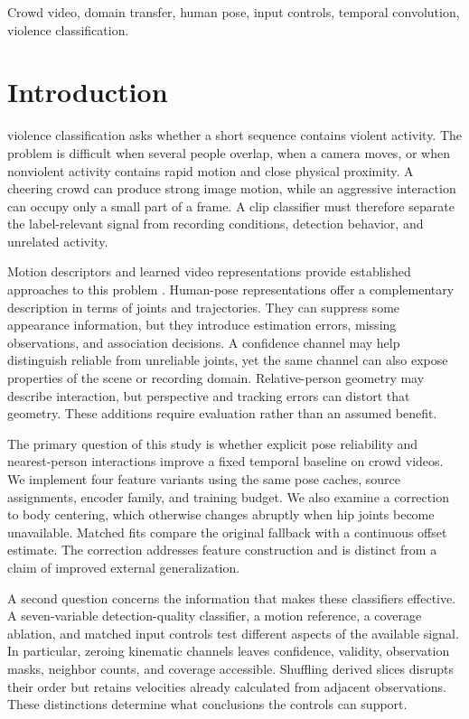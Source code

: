\documentclass[journal]{IEEEtai}
\begin{document}
\begin{IEEEkeywords}
Crowd video, domain transfer, human pose, input controls, temporal convolution, violence classification.
\end{IEEEkeywords}

\section{Introduction}
 violence classification asks whether a short sequence contains violent activity. The problem is difficult when several people overlap, when a camera moves, or when nonviolent activity contains rapid motion and close physical proximity. A cheering crowd can produce strong image motion, while an aggressive interaction can occupy only a small part of a frame. A clip classifier must therefore separate the label-relevant signal from recording conditions, detection behavior, and unrelated activity.

Motion descriptors and learned video representations provide established approaches to this problem \cite{hassner2012,nievas2011,serrano2015,cheng2020}. Human-pose representations offer a complementary description in terms of joints and trajectories. They can suppress some appearance information, but they introduce estimation errors, missing observations, and association decisions. A confidence channel may help distinguish reliable from unreliable joints, yet the same channel can also expose properties of the scene or recording domain. Relative-person geometry may describe interaction, but perspective and tracking errors can distort that geometry. These additions require evaluation rather than an assumed benefit.

The primary question of this study is whether explicit pose reliability and nearest-person interactions improve a fixed temporal baseline on crowd videos. We implement four feature variants using the same pose caches, source assignments, encoder family, and training budget. We also examine a correction to body centering, which otherwise changes abruptly when hip joints become unavailable. Matched fits compare the original fallback with a continuous offset estimate. The correction addresses feature construction and is distinct from a claim of improved external generalization.

A second question concerns the information that makes these classifiers effective. A seven-variable detection-quality classifier, a motion reference, a coverage ablation, and matched input controls test different aspects of the available signal. In particular, zeroing kinematic channels leaves confidence, validity, observation masks, neighbor counts, and coverage accessible. Shuffling derived slices disrupts their order but retains velocities already calculated from adjacent observations. These distinctions determine what conclusions the controls can support.
\end{document}
